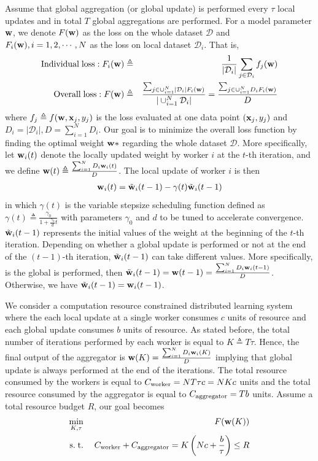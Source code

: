 \documentclass[11pt, fullpage,letterpaper]{article}
\newcommand{\bx}{{\bf x}}
\newcommand{\bw}{{\bf w}}
\begin{document}
\begin{enumerate}
Assume that global aggregation (or global update) is performed every $\tau$ local updates and in total $T$ global aggregations are performed. For a model parameter $\bw$, we denote $F(\bw)$ as the loss on the whole dataset $\mathcal{D}$ and $F_i(\bw), i=1,2,\cdots,N$ as the loss on local dataset $\mathcal{D}_i$. That is,
\begin{eqnarray}
{\rm Individual \;loss:\;}F_i(\bw)&\triangleq& \frac{1}{|\mathcal{D}_i|}\sum_{j\in \mathcal{D}_i}f_j(\bw)\\
{\rm Overall\;loss:\;}F(\bw)&\triangleq &\frac{\sum_{j\in \cup_{i=1}^{N}|\mathcal{D}_i|F_i(\bw)}}{|\cup_{i=1}^{N}\mathcal{D}_i|}=\frac{\sum_{j\in \cup_{i=1}^{N}D_iF_i(\bw)}}{D}
\end{eqnarray}
where $f_j\triangleq f(\bw, \bx_j,y_j)$ is the loss evaluated at one data point $(\bx_j,y_j)$ and $D_i=|\mathcal{D}_i|,D=\sum_{i=1}^ND_i$. Our goal is to minimize the overall loss function by finding the optimal weight $\bw*$ regarding the whole dataset $\mathcal{D}$. More specifically, let $\bw_i(t)$ denote the locally updated weight by worker $i$ at the $t$-th iteration, and we define $\bw(t)\triangleq \frac{\sum_{i=1}^ND_i\bw_i(t)}{D}$. The local update of worker $i$ is then
\begin{eqnarray}
\bw_i(t) = \tilde{\bw}_i(t-1)-\gamma(t) \tilde{\bw}_i(t-1)
\end{eqnarray}
in which $\gamma(t)$ is the variable stepsize scheduling function defined as $\gamma(t)\triangleq\frac{\gamma_0}{1+\frac{\gamma_0}{d}t}$ with parameters $\gamma_0$ and $d$ to be tuned to accelerate convergence. $\tilde{\bw}_i(t-1)$ represents the initial values of the weight at the beginning of the $t$-th iteration. Depending on whether a global update  is performed or not at the end of the $(t-1)$-th iteration, $\tilde{\bw}_i(t-1)$ can take different values. More specifically, is the global is performed, then $\tilde{\bw}_i(t-1) = \bw(t-1)=\frac{\sum_{i=1}^ND_i\bw_i(t-1)}{D}$. Otherwise, we have $\tilde{\bw}_i(t-1) = \bw_i(t-1)$.

We consider a computation resource constrained distributed learning system where the each local update at a single worker consumes $c$ units of resource and each global update consumes $b$ units of resource. As stated before, the total number of iterations performed by each worker is equal to $K\triangleq  T\tau$. Hence, the final output of the aggregator is $\bw(K)=\frac{\sum_{i=1}^ND_i\bw_i(K)}{D}$ implying that global update is always performed at the end of the iterations. The total resource consumed by the workers is equal to $C_{\rm worker}=NT\tau c=NKc$ units and the total resource consumed by the aggregator is equal to $C_{\rm aggregator} = Tb$ units. Assume a total resource budget $R$, our goal becomes
\begin{eqnarray}
\min_{K, \tau} & \;& F(\bw(K))\\
{\rm s.\;t.} &\;& C_{\rm worker} +C_{\rm aggregator}= K\left(Nc +\frac{b}{\tau}   \right) \le R
\end{eqnarray}



\end{enumerate}
\end{document}
